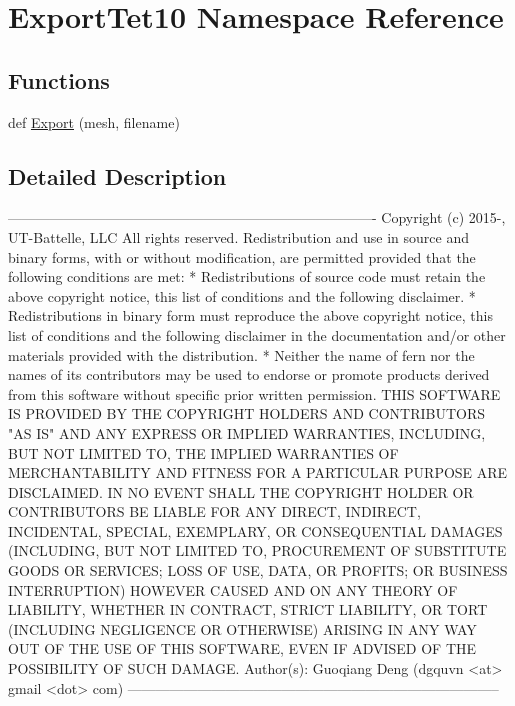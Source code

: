 \hypertarget{a00213}{}\section{Export\+Tet10 Namespace Reference}
\label{a00213}
\subsection*{Functions}
\begin{DoxyCompactItemize}
\item 
def \hyperlink{a00213_ab3114f6532ec029d3077b10ee4da4a72}{Export} (mesh, filename)
\end{DoxyCompactItemize}


\subsection{Detailed Description}
\begin{DoxyVerb}-------------------------------------------------------------------------------
 Copyright (c) 2015-, UT-Battelle, LLC
 All rights reserved.
 Redistribution and use in source and binary forms, with or without
 modification, are permitted provided that the following conditions are met:
 * Redistributions of source code must retain the above copyright notice, this
 list of conditions and the following disclaimer.
 * Redistributions in binary form must reproduce the above copyright notice,
 this list of conditions and the following disclaimer in the documentation
 and/or other materials provided with the distribution.
 * Neither the name of fern nor the names of its
 contributors may be used to endorse or promote products derived from
 this software without specific prior written permission.
 THIS SOFTWARE IS PROVIDED BY THE COPYRIGHT HOLDERS AND CONTRIBUTORS "AS IS"
 AND ANY EXPRESS OR IMPLIED WARRANTIES, INCLUDING, BUT NOT LIMITED TO, THE
 IMPLIED WARRANTIES OF MERCHANTABILITY AND FITNESS FOR A PARTICULAR PURPOSE ARE
 DISCLAIMED. IN NO EVENT SHALL THE COPYRIGHT HOLDER OR CONTRIBUTORS BE LIABLE
 FOR ANY DIRECT, INDIRECT, INCIDENTAL, SPECIAL, EXEMPLARY, OR CONSEQUENTIAL
 DAMAGES (INCLUDING, BUT NOT LIMITED TO, PROCUREMENT OF SUBSTITUTE GOODS OR
 SERVICES; LOSS OF USE, DATA, OR PROFITS; OR BUSINESS INTERRUPTION) HOWEVER
 CAUSED AND ON ANY THEORY OF LIABILITY, WHETHER IN CONTRACT, STRICT LIABILITY,
 OR TORT (INCLUDING NEGLIGENCE OR OTHERWISE) ARISING IN ANY WAY OUT OF THE USE
 OF THIS SOFTWARE, EVEN IF ADVISED OF THE POSSIBILITY OF SUCH DAMAGE.
 Author(s): Guoqiang Deng (dgquvn <at> gmail <dot> com)
 --------------------------------------------------------------------------------\end{DoxyVerb}
 

